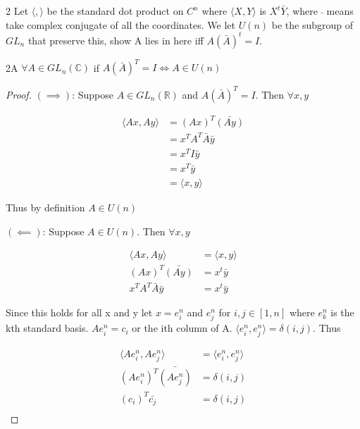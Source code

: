 \documentclass{article}
\newcommand{\C}{\mathbb{C}}
\newcommand{\R}{\mathbb{R}}
\newcommand{\angles}[1]{\langle{#1}\rangle}
\begin{document}
\begin{PROB}{2}\label{Problem 2.}
    Let $\angles{,}$ be the standard dot product on $C^n$ where $\angles{X, Y}$ is $X^t \bar{Y}$, where $\bar{}$ means take complex conjugate of all the coordinates. We let $U(n)$ be the subgroup of $GL_n$ that preserve this, show A lies in here iff $A (\bar A)^t = I$.
\end{PROB}
\begin{claim}{2A}
    $\forall A \in GL_n(\C)$ if $A (\bar A)^T = I \iff A \in U(n)$
\end{claim}
\begin{proof}
    $(\implies)$: Suppose $A \in GL_n(\R)$ and $A (\bar A)^T = I$. Then $\forall x, y$ 
    
    \begin{align*}{}
        \angles{Ax, Ay} &= (Ax)^T \bar{(Ay)} \\
        &=  x^T A^T \bar{A} \bar{y} \\
        &=  x^T I \bar{y} \\
        &= x^T \bar{y} \\
        &= \angles{x, y}
    \end{align*}

    Thus by definition $A \in U(n)$

    $(\impliedby)$: Suppose $A \in U(n)$. Then $\forall x, y$ 
    
    \begin{align*}{}
        \angles{Ax, Ay} &= \angles{x, y} \\
        (Ax)^T \bar{(Ay)} &=  x^t \bar{y} \\
        x^T A^T \bar{A} \bar{y} &= x^t \bar{y}
    \end{align*}

    Since this holds for all x and y let $x = e^n_i$ and $e^n_j$ for $i, j \in [1, n]$ where $e^n_k$ is the kth standard basis. $Ae^n_i = c_i$ or the ith column of A. $\angles{e^n_i, e^n_j} = \delta(i, j)$. Thus

    \begin{align*}{}
        \angles{Ae^n_i, Ae^n_j} &= \angles{e^n_i, e^n_j} \\
        (Ae^n_i)^T \bar{(Ae^n_j)} &= \delta(i, j) \\
        (c_i)^T \bar{c_j} &= \delta(i, j) \\
    \end{align*}


\end{proof}
\end{document}
